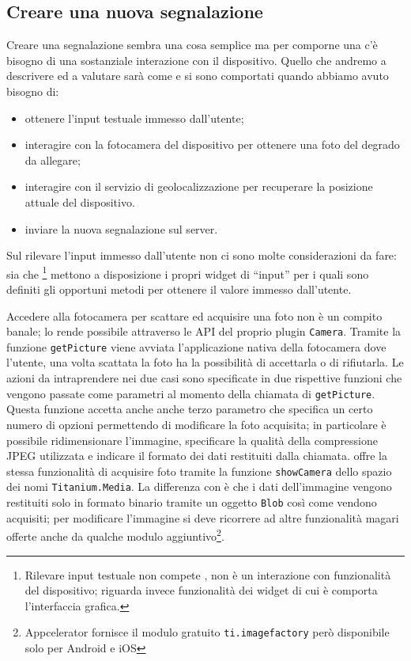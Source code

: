 		\subsection{Creare una nuova segnalazione}
			Creare una segnalazione sembra una cosa semplice ma per
			comporne una c'è bisogno di una sostanziale interazione con il
			dispositivo. Quello che andremo a descrivere ed a valutare sarà
			come \pg{} e \tisdk{} si sono comportati quando abbiamo avuto
			bisogno di:
			\begin{itemize}
				\item ottenere l'input testuale immesso dall'utente;
				\item interagire con la fotocamera del dispositivo per ottenere
					una foto del degrado da allegare;
				\item interagire con il servizio di geolocalizzazione per
					recuperare la posizione attuale del dispositivo.
				\item inviare la nuova segnalazione sul server.
			\end{itemize}
			
			\noindent Sul rilevare l'input immesso dall'utente non ci sono molte
			considerazioni da fare: sia \tisdk{} che
			\kendomob{}\footnote{Rilevare input testuale non compete \pg{}, non
			è un interazione con funzionalità del dispositivo; riguarda invece
			funzionalità dei widget di cui è comporta l'interfaccia grafica.}
			mettono a disposizione i propri widget di ``input'' per i quali sono
			definiti gli opportuni metodi per ottenere il valore immesso
			dall'utente.
			
			Accedere alla fotocamera per scattare ed acquisire una foto non è un 
			compito banale; \pg{} lo rende possibile attraverso le API del
			proprio plugin \texttt{Camera}. Tramite la funzione
			\texttt{getPicture} viene avviata l'applicazione nativa della
			fotocamera dove l'utente, una volta scattata la foto ha la
			possibilità di accettarla o di rifiutarla. Le azioni da
			intraprendere nei due casi sono specificate in due rispettive
			funzioni \js{} che vengono passate come parametri al momento della
			chiamata di	\texttt{getPicture}. Questa funzione accetta anche
			anche terzo parametro che specifica un certo numero di opzioni
			permettendo di modificare la foto acquisita; in particolare è
			possibile ridimensionare l'immagine, specificare la qualità della
			compressione JPEG utilizzata e indicare il formato dei dati
			restituiti dalla chiamata. \tisdk{} offre la stessa funzionalità di
			acquisire foto tramite la funzione \texttt{showCamera} dello spazio
			dei nomi \texttt{Titanium.Media}. La differenza con \pg{} è che i
			dati dell'immagine vengono restituiti solo in formato binario
			tramite un oggetto \js{} \texttt{Blob} così come vendono acquisiti;
			per modificare l'immagine si deve ricorrere ad altre funzionalità
			magari offerte anche da qualche modulo aggiuntivo\footnote{Appcelerator
			fornisce il modulo gratuito \texttt{ti.imagefactory} però
			disponibile solo per Android e iOS}.
			
